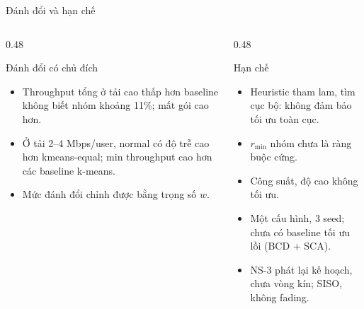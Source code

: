 \documentclass[aspectratio=169,10pt,t]{beamer}
\begin{document}
\begin{frame}{Đánh đổi và hạn chế}
\begin{columns}[T,onlytextwidth]
\begin{column}{0.48\textwidth}
\vspace{0pt}
  \begin{block}{Đánh đổi có chủ đích}
    \small
    \begin{itemize}
      \item Throughput tổng ở tải cao thấp hơn baseline không biết nhóm khoảng 11\%; mất gói cao hơn.
      \item Ở tải 2--4 Mbps/user, normal có độ trễ cao hơn kmeans-equal; min throughput cao hơn các baseline k-means.
      \item Mức đánh đổi chỉnh được bằng trọng số $w$.
    \end{itemize}
  \end{block}
\end{column}
\begin{column}{0.48\textwidth}
\vspace{0pt}
  \begin{block}{Hạn chế}
    \small
    \begin{itemize}
      \item Heuristic tham lam, tìm cục bộ: không đảm bảo tối ưu toàn cục.
      \item $r_{\min}$ nhóm chưa là ràng buộc cứng.
      \item Công suất, độ cao không tối ưu.
      \item Một cấu hình, 3 seed; chưa có baseline tối ưu lồi (BCD + SCA).
      \item NS-3 phát lại kế hoạch, chưa vòng kín; SISO, không fading.
    \end{itemize}
  \end{block}
\end{column}
\end{columns}
\end{frame}
\end{document}
